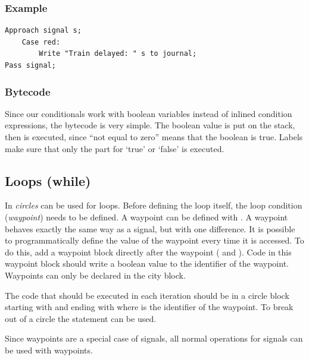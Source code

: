 \subsubsection*{Example}

\begin{lstlisting}
Approach signal s;
	Case red:
		Write "Train delayed: " s to journal;
Pass signal;
\end{lstlisting}

\subsubsection*{Bytecode}

Since our conditionals work with boolean variables instead of inlined condition expressions, the bytecode is very simple. The boolean value is put on the stack, then  is executed, since ``not equal to zero'' means that the boolean is true. Labels make sure that only the part for `true' or `false' is executed.

\subsection{Loops (while)}

In \shortname \emph{circles} can be used for loops. Before defining the loop itself, the loop condition (\emph{waypoint}) needs to be defined. A waypoint can be defined with . A waypoint behaves exactly the same way as a signal, but with one difference. It is possible to programmatically define the value of the waypoint every time it is accessed. To do this, add a waypoint block directly after the waypoint ( and ). Code in this waypoint block should write a boolean value to the identifier of the waypoint. Waypoints can only be declared in the  city block.

The code that should be executed in each iteration should be in a circle block starting with  and ending with  where  is the identifier of the waypoint. To break out of a circle the statement  can be used.

Since waypoints are a special case of signals, all normal operations for signals can be used with waypoints.

